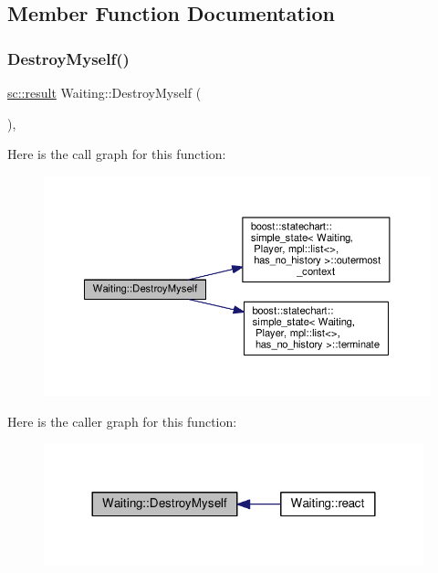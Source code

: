 \subsection{Member Function Documentation}
\mbox{\label{struct_waiting_a130dc49639541e8bc0bc04b8b81fc90f}} 
\subsubsection{\texorpdfstring{Destroy\+Myself()}{DestroyMyself()}}
{\footnotesize\ttfamily \mbox{\hyperlink{namespaceboost_1_1statechart_abe807f6598b614d6d87bb951ecd92331}{sc\+::result}} Waiting\+::\+Destroy\+Myself (\begin{DoxyParamCaption}{ }\end{DoxyParamCaption})\hspace{0.3cm}{\ttfamily [inline]}, {\ttfamily [private]}}

Here is the call graph for this function\+:
\nopagebreak
\begin{figure}[H]
\begin{center}
\leavevmode
\includegraphics[width=350pt]{struct_waiting_a130dc49639541e8bc0bc04b8b81fc90f_cgraph}
\end{center}
\end{figure}
Here is the caller graph for this function\+:
\nopagebreak
\begin{figure}[H]
\begin{center}
\leavevmode
\includegraphics[width=312pt]{struct_waiting_a130dc49639541e8bc0bc04b8b81fc90f_icgraph}
\end{center}
\end{figure}
\mbox{\label{struct_waiting_a161ef2052a6de4dfc9189317db05b4e3}} 
